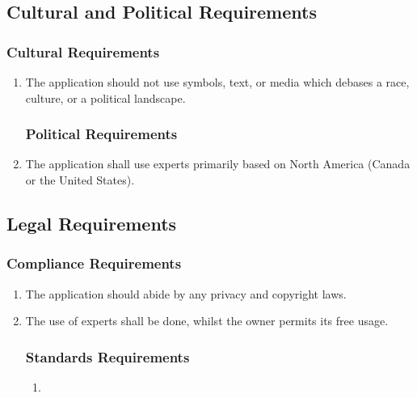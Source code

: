 \documentclass[]{article}
\begin{document}

\subsection{Cultural and Political Requirements}
\label{sub:cultural_and_political_requirements}

\subsubsection{Cultural Requirements}
\label{ssub:cultural_requirements}
\begin{enumerate}[{CP}1. ]
	\item The application should not use symbols, text, or media which debases a race, culture, or a political landscape.

\subsubsection{Political Requirements}
\label{ssub:political_requirements}
	\item The application shall use experts primarily based on North America (Canada or the United States). 
\end{enumerate}


\subsection{Legal Requirements}
\label{sub:legal_requirements}

\subsubsection{Compliance Requirements}
\label{ssub:compliance_requirements}
\begin{enumerate}[{LR}1. ]
	\item The application should abide by any privacy and copyright laws.
	\item The use of experts shall be done, whilst the owner permits its free usage.

\subsubsection{Standards Requirements}
\label{ssub:standards_requirements}
\begin{enumerate}[{N/A} ]
	\item
\end{enumerate}
\end{enumerate}


\end{document}
